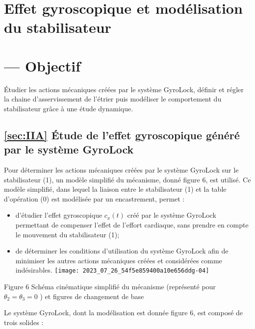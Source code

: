 
\section{Effet gyroscopique et modélisation du stabilisateur}
\section{— Objectif}
Étudier les actions mécaniques créées par le système GyroLock, définir et régler la chaine d'asservissement de l'étrier puis modéliser le comportement du stabilisateur grâce à une étude dynamique.

\subsection{\ref{sec:IIA} Étude de l'effet gyroscopique généré par le système GyroLock}
Pour déterminer les actions mécaniques créées par le système GyroLock sur le stabilisateur (1), un modèle simplifié du mécanisme, donné figure 6, est utilisé. Ce modèle simplifié, dans lequel la liaison entre le stabilisateur (1) et la table d'opération (0) est modélisée par un encastrement, permet :

\begin{itemize}
  \item d'étudier l'effet gyroscopique $c_{x}(t)$ créé par le système GyroLock permettant de compenser l'effet de l'effort cardiaque, sans prendre en compte le mouvement du stabilisateur (1);

  \item de déterminer les conditions d'utilisation du système GyroLock afin de minimiser les autres actions mécaniques créées et considérées comme indésirables.
\texttt{[image: 2023\_07\_26\_54f5e859400a10e656ddg-04]}

\end{itemize}

Figure 6 Schéma cinématique simplifié du mécanisme (représenté pour $\theta_{2}=\theta_{3}=0$ ) et figures de changement de base

Le système GyroLock, dont la modélisation est donnée figure 6, est composé de trois solides :

